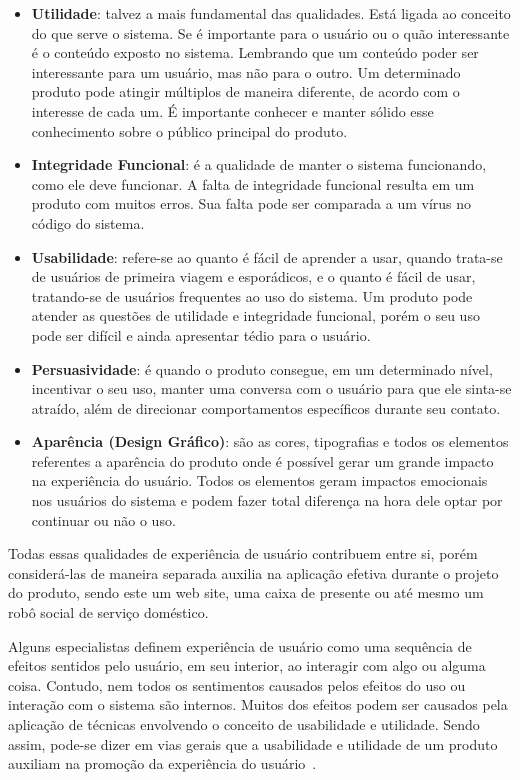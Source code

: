 \begin{itemize}
    \item \textbf{Utilidade}: talvez a mais fundamental das qualidades. Está ligada ao conceito do que serve o sistema. Se é importante para o usuário ou o quão interessante é o conteúdo exposto no sistema. Lembrando que um conteúdo poder ser interessante para um usuário, mas não para o outro. Um determinado produto pode atingir múltiplos de maneira diferente, de acordo com o interesse de cada um. É importante conhecer e manter sólido esse conhecimento sobre o público principal do produto.
    \item \textbf{Integridade Funcional}: é a qualidade de manter o sistema funcionando, como ele deve funcionar. A falta de integridade funcional resulta em um produto com muitos erros. Sua falta pode ser comparada a um vírus no código do sistema.
    \item \textbf{Usabilidade}: refere-se ao quanto é fácil de aprender a usar, quando trata-se de usuários de primeira viagem e esporádicos, e o quanto é fácil de usar, tratando-se de usuários frequentes ao uso do sistema. Um produto pode atender as questões de utilidade e integridade funcional, porém o seu uso pode ser difícil e ainda apresentar tédio para o usuário.
    \item \textbf{Persuasividade}: é quando o produto consegue, em um determinado nível, incentivar o seu uso, manter uma conversa com o usuário para que ele sinta-se atraído, além de direcionar comportamentos específicos durante seu contato.
    \item \textbf{Aparência (Design Gráfico)}: são as cores, tipografias e todos os elementos referentes a aparência do produto onde é possível gerar um grande impacto na experiência do usuário. Todos os elementos geram impactos emocionais nos usuários do sistema e podem fazer total diferença na hora dele optar por continuar ou não o uso.
\end{itemize}

Todas essas qualidades de experiência de usuário contribuem entre si, porém considerá-las de maneira separada auxilia na aplicação efetiva durante o projeto do produto, sendo este um web site, uma caixa de presente ou até mesmo um robô social de serviço doméstico.

Alguns especialistas definem experiência de usuário como uma sequência de efeitos sentidos pelo usuário, em seu interior, ao interagir com algo ou alguma coisa. Contudo, nem todos os sentimentos causados pelos efeitos do uso ou interação com o sistema são internos. Muitos dos efeitos podem ser causados pela aplicação de técnicas envolvendo o conceito de usabilidade e utilidade. Sendo assim, pode-se dizer em vias gerais que a usabilidade e utilidade de um produto auxiliam na promoção da experiência do usuário~\cite{moggridge:2007, hartson:2012}.

